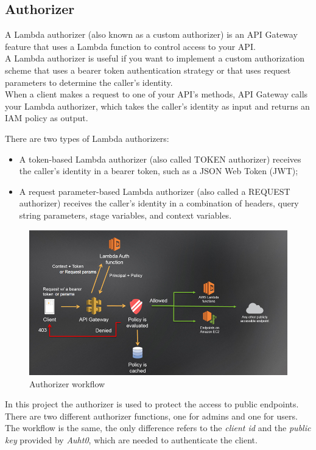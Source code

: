 \subsection{Authorizer}
A Lambda authorizer (also known as a custom authorizer) is an API Gateway feature that uses a Lambda function to control access to your API.\\
A Lambda authorizer is useful if you want to implement a custom authorization scheme that uses a bearer token authentication strategy or that uses request parameters to determine the caller's identity.\\
When a client makes a request to one of your API's methods, API Gateway calls your Lambda authorizer, which takes the caller's identity as input and returns an IAM policy as output.

There are two types of Lambda authorizers:
\begin{itemize}
	\item A token-based Lambda authorizer (also called TOKEN authorizer) receives the caller's identity in a bearer token, such as a JSON Web Token (JWT);

	\item A request parameter-based Lambda authorizer (also called a REQUEST authorizer) receives the caller's identity in a combination of headers, query string parameters, stage variables, and context variables.
\end{itemize}
\begin{figure} [H]
	\centering
	\includegraphics[scale=0.6]{../Img/authorizer}
	\caption{Authorizer workflow}\label{}
\end{figure}

In this project the authorizer is used to protect the access to public endpoints. There are two different authorizer functions, one for admins and one for users. The workflow is the same, the only difference refers to the \emph{client id} and the \emph{public key} provided by \emph{Auht0}, which are needed to authenticate the client.

